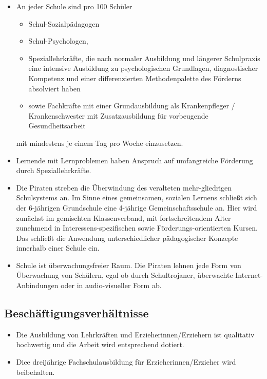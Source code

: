 \documentclass[10pt,a4paper,twocolumn,twoside,titlepage]{article}
\begin{document}
\begin{itemize}
\item An jeder Schule sind pro 100 Schüler
\begin{itemize}
\item Schul-Sozialpädagogen
\item Schul-Psychologen,
\item Speziallehrkräfte, die nach normaler Ausbildung und längerer Schulpraxis eine intensive Ausbildung zu psychologischen Grundlagen, diagnostischer Kompetenz und einer differenzierten Methodenpalette des Förderns absolviert haben
\item sowie Fachkräfte mit einer Grundausbildung als Krankenpfleger / Krankenschwester mit Zusatzausbildung für vorbeugende Gesundheitsarbeit
\end{itemize}

mit mindestens je einem Tag pro Woche einzusetzen.

\item Lernende mit Lernproblemen haben Anspruch auf umfangreiche Förderung durch Speziallehrkräfte.

\item Die Piraten streben die Überwindung des veralteten mehr-gliedrigen Schulsystems an. Im Sinne eines gemeinsamen, sozialen Lernens schließt sich der 6-jährigen Grundschule eine 4-jährige Gemeinschaftsschule an. Hier wird zunächst im gemischten Klassenverband, mit fortschreitendem Alter zunehmend in Interessens-spezifischen sowie Förderungs-orientierten Kursen.
Das schließt die Anwendung unterschiedlicher pädagogischer Konzepte innerhalb einer Schule ein.

\item Schule ist überwachungsfreier Raum. Die Piraten lehnen jede Form von Überwachung von Schülern, egal ob durch Schultrojaner, überwachte Internet-Anbindungen oder in audio-visueller Form ab.
\end{itemize}

\subsection{Beschäftigungsverhältnisse}
\begin{itemize}
\item Die Ausbildung von Lehrkräften und Erzieherinnen/Erziehern ist qualitativ hochwertig und die Arbeit wird entsprechend dotiert.
\item Diee dreijährige Fachschulausbildung für Erzieherinnen/Erzieher wird beibehalten.
\end{itemize}
\end{document}

